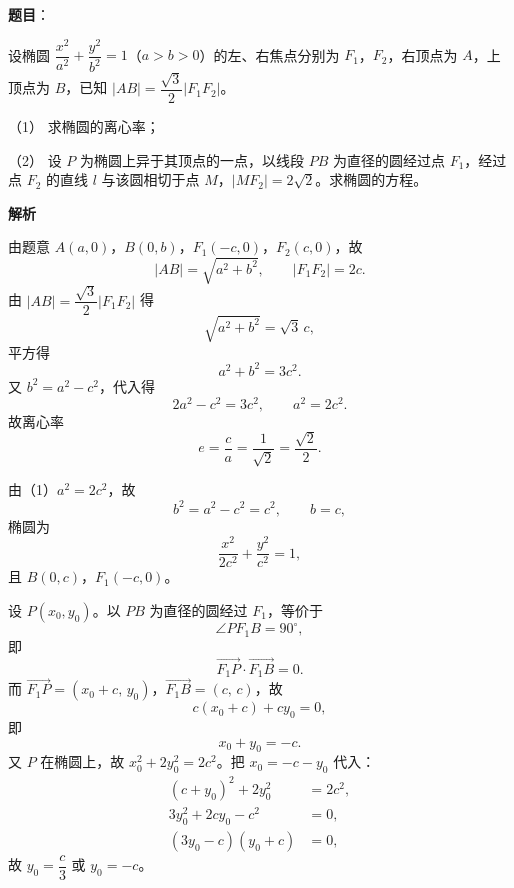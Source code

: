 \begin{answer}


\end{answer}
\begin{answer}

\textbf{题目}：

设椭圆 $\dfrac{x^2}{a^2}+\dfrac{y^2}{b^2}=1$（$a>b>0$）的左、右焦点分别为 $F_1$，$F_2$，右顶点为 $A$，上顶点为 $B$，已知 $|AB|=\dfrac{\sqrt3}{2}|F_1F_2|$。

（1） 求椭圆的离心率；

（2） 设 $P$ 为椭圆上异于其顶点的一点，以线段 $PB$ 为直径的圆经过点 $F_1$，经过点 $F_2$ 的直线 $l$ 与该圆相切于点 $M$，$|MF_2|=2\sqrt2$。求椭圆的方程。

\textbf{解析}


由题意 $A(a,0)$，$B(0,b)$，$F_1(-c,0)$，$F_2(c,0)$，故
\nopagebreak[4]
\[|AB|=\sqrt{a^2+b^2},\qquad |F_1F_2|=2c.\]
由 $|AB|=\dfrac{\sqrt3}{2}|F_1F_2|$ 得
\nopagebreak[4]
\[\sqrt{a^2+b^2}=\sqrt3\,c,\]
平方得
\nopagebreak[4]
\[a^2+b^2=3c^2.\]
又 $b^2=a^2-c^2$，代入得
\nopagebreak[4]
\[2a^2-c^2=3c^2,\qquad a^2=2c^2.\]
故离心率
\nopagebreak[4]
\[e=\frac ca=\frac{1}{\sqrt2}=\frac{\sqrt2}{2}.\]


由（1）$a^2=2c^2$，故
\nopagebreak[4]
\[b^2=a^2-c^2=c^2,\qquad b=c,\]
椭圆为
\nopagebreak[4]
\[\frac{x^2}{2c^2}+\frac{y^2}{c^2}=1,\]
且 $B(0,c)$，$F_1(-c,0)$。

设 $P(x_0,y_0)$。以 $PB$ 为直径的圆经过 $F_1$，等价于
\nopagebreak[4]
\[\angle PF_1B=90^\circ,\]
即
\nopagebreak[4]
\[\overrightarrow{F_1P}\cdot\overrightarrow{F_1B}=0.\]
而 $\overrightarrow{F_1P}=(x_0+c,\,y_0)$，$\overrightarrow{F_1B}=(c,\,c)$，故
\nopagebreak[4]
\[c(x_0+c)+cy_0=0,\]
即
\nopagebreak[4]
\[x_0+y_0=-c.\]
又 $P$ 在椭圆上，故 $x_0^2+2y_0^2=2c^2$。把 $x_0=-c-y_0$ 代入：
\nopagebreak[4]
\[\begin{aligned}
(c+y_0)^2+2y_0^2&=2c^2,\\
3y_0^2+2cy_0-c^2&=0,\\
(3y_0-c)(y_0+c)&=0,
\end{aligned}\]
故 $y_0=\dfrac c3$ 或 $y_0=-c$。


\end{answer}
